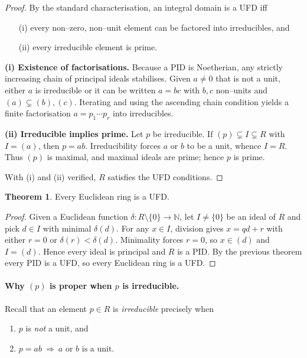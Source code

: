 \documentclass[12pt]{article}
\theoremstyle{definition} %
\newtheorem{theorem}{Theorem}
\theoremstyle{plain} %
\begin{document}
      \begin{proof}
      By the standard characterisation, an integral domain is a UFD iff
      \begin{enumerate}
        \item[(i)] every non--zero, non--unit element can be factored into
                   irreducibles, and
        \item[(ii)] every irreducible element is prime.
      \end{enumerate}
      
      \medskip
      \noindent\textbf{(i) Existence of factorisations.}
      Because a PID is Noetherian, any strictly increasing chain of principal
      ideals stabilises.
      Given $a\neq0$ that is not a unit, either $a$ is irreducible or it can be
      written $a=bc$ with $b,c$ non--units and $(a)\subsetneq(b),(c)$.
      Iterating and using the ascending chain condition yields a finite
      factorisation $a=p_1\cdots p_r$ into irreducibles.
      
      \smallskip
      \noindent\textbf{(ii) Irreducible implies prime.}
      Let $p$ be irreducible.
      If $(p)\subsetneq I\subsetneq R$ with $I=(a)$, then $p=ab$.
      Irreducibility forces $a$ or $b$ to be a unit, whence $I=R$.
      Thus $(p)$ is maximal, and maximal ideals are prime; hence $p$ is prime.
      
      \smallskip
      With (i) and (ii) verified, $R$ satisfies the UFD conditions.
      \end{proof}
      
      \begin{theorem}
      Every Euclidean ring is a UFD.
      \end{theorem}
      
      \begin{proof}
      Given a Euclidean function $\delta\colon R\setminus\{0\}\to\mathbb N$,
      let $I\neq\{0\}$ be an ideal of $R$ and pick $d\in I$ with minimal
      $\delta(d)$.
      For any $x\in I$, division gives $x=qd+r$ with either $r=0$ or
      $\delta(r)<\delta(d)$.
      Minimality forces $r=0$, so $x\in(d)$ and $I=(d)$.
      Hence every ideal is principal and $R$ is a PID.
      By the previous theorem every PID is a UFD, so every Euclidean ring is a
      UFD.
      \end{proof}
      \paragraph{Why $(p)$ is proper when $p$ is irreducible.}
Recall that an element $p\in R$ is \emph{irreducible} precisely when
\begin{enumerate}
  \item $p$ is \emph{not} a unit, and
  \item $p=ab\ \Longrightarrow\ a\text{ or }b\text{ is a unit.}$
\end{enumerate}
\end{document}
